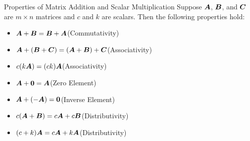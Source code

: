 \documentclass{beamer}
\begin{document}
\begin{frame}
\begin{block}{Properties of Matrix Addition and Scalar Multiplication}
Suppose $\boldsymbol{A}$, $\boldsymbol{B}$, and $\boldsymbol{C}$ are $m\times n$ matrices and $c$ and $k$ are scalars. Then the following properties hold:
\begin{itemize}
\item<+->$\boldsymbol{A}+\boldsymbol{B}=\boldsymbol{B}+\boldsymbol{A}$\hfill(Commutativity)
\item<+->$\boldsymbol{A}+(\boldsymbol{B}+\boldsymbol{C})=(\boldsymbol{A}+\boldsymbol{B})+\boldsymbol{C}$\hfill(Associativity)
\item<+->$c(k\boldsymbol{A})=(ck)\boldsymbol{A}$\hfill(Associativity)
\item<+->$\boldsymbol{A}+\textbf{0}=\boldsymbol{A}$\hfill(Zero Element)
\item<+->$\boldsymbol{A}+(-\boldsymbol{A})=\textbf{0}$\hfill(Inverse Element)
\item<+->$c(\boldsymbol{A}+\boldsymbol{B})=c\boldsymbol{A}+c\boldsymbol{B}$\hfill(Distributivity)
\item<+->$(c+k)\boldsymbol{A}=c\boldsymbol{A}+k\boldsymbol{A}$\hfill(Distributivity)
\end{itemize}
\end{block}
\end{frame}
\end{document}
